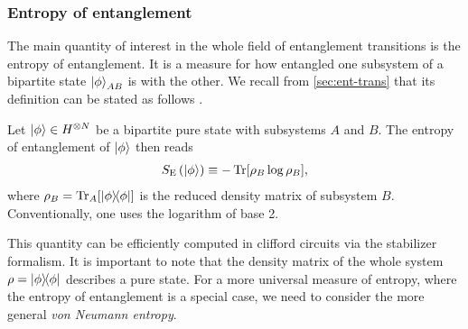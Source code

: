 \subsubsection{Entropy of entanglement}
The main quantity of interest in the whole field of entanglement transitions is
the entropy of entanglement. It is a measure for how entangled one subsystem of a
bipartite state $\ket{\phi}_{AB}$ is with the other. We recall from
\cref{sec:ent-trans} that its definition can be stated as follows
\cite{fattalEntanglementStabilizerFormalism2004}.
\begin{defn}\label{defn:entanglement-entropy}
  Let $\ket{\phi}\in H^{\otimes N}$ be a bipartite pure state with subsystems
  $A$ and $B$. The entropy of entanglement of $\ket{\phi}$ then reads
  \begin{align}
    S_\mathrm{E}\left(\ket{\phi}\right) \equiv - \Tr[\rho_B \log \rho_B],
  \end{align}
  where $\rho_B = \Tr_A[\dyad{\phi}]$ is the reduced density matrix of subsystem
  $B$. Conventionally, one uses the logarithm of base 2.
\end{defn}
This quantity can be efficiently computed in clifford circuits via the
stabilizer formalism. It is important to note that the density matrix of the
whole system $\rho = \dyad{\phi}$ describes a pure state. For a more universal
measure of entropy, where the entropy of entanglement is a special case, we
need to consider the more general \emph{von Neumann entropy}.
